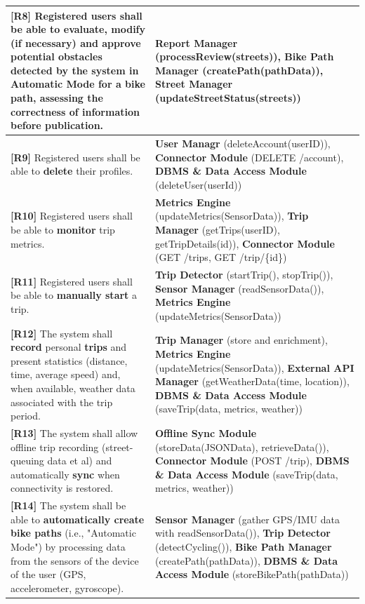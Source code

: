 \documentclass{Configuration_Files/PoliMi3i_thesis}
\begin{document}
\begin{longtable}{|p{}|p{}|}
    \hline
    \textbf{[R8]} Registered users shall be able to evaluate, modify (if necessary) and approve potential \textbf{obstacles} detected by the system in Automatic Mode for a bike path, assessing the correctness of information before publication. & \textbf{Report Manager} (processReview(streets)), \textbf{Bike Path Manager} (createPath(pathData)), \textbf{Street Manager} (updateStreetStatus(streets)) \\
    \hline
    \textbf{[R9]} Registered users shall be able to \textbf{delete} their profiles. & \textbf{User Managr} (deleteAccount(userID)), \textbf{Connector Module} (DELETE /account), \textbf{DBMS \& Data Access Module} (deleteUser(userId)) \\
    \hline
    \textbf{[R10]} Registered users shall be able to \textbf{monitor} trip metrics. & \textbf{Metrics Engine} (updateMetrics(SensorData)), \textbf{Trip Manager} (getTrips(userID), getTripDetails(id)), \textbf{Connector Module} (GET /trips, GET /trip/\{id\}) \\
    \hline
    \textbf{[R11]} Registered users shall be able to \textbf{manually start} a trip. & \textbf{Trip Detector} (startTrip(), stopTrip()), \textbf{Sensor Manager} (readSensorData()), \textbf{Metrics Engine} (updateMetrics(SensorData)) \\
    \hline
    \textbf{[R12]} The system shall \textbf{record} personal \textbf{trips} and present statistics (distance, time, average speed) and, when available, weather data associated with the trip period. & \textbf{Trip Manager} (store and enrichment), \textbf{Metrics Engine} (updateMetrics(SensorData)), \textbf{External API Manager} (getWeatherData(time, location)), \textbf{DBMS \& Data Access Module} (saveTrip(data, metrics, weather)) \\
    \hline
    \textbf{[R13]} The system shall allow offline trip recording (street-queuing data et al) and automatically \textbf{sync} when connectivity is restored. & \textbf{Offline Sync Module} (storeData(JSONData), retrieveData()), \textbf{Connector Module} (POST /trip), \textbf{DBMS \& Data Access Module} (saveTrip(data, metrics, weather)) \\
    \hline
    \textbf{[R14]} The system shall be able to \textbf{automatically create bike paths} (i.e., "Automatic Mode") by processing data from the sensors of the device of the user (GPS, accelerometer, gyroscope). & \textbf{Sensor Manager} (gather GPS/IMU data with readSensorData()), \textbf{Trip Detector} (detectCycling()), \textbf{Bike Path Manager} (createPath(pathData)), \textbf{DBMS \& Data Access Module} (storeBikePath(pathData)) \\

\end{longtable}
\end{document}
